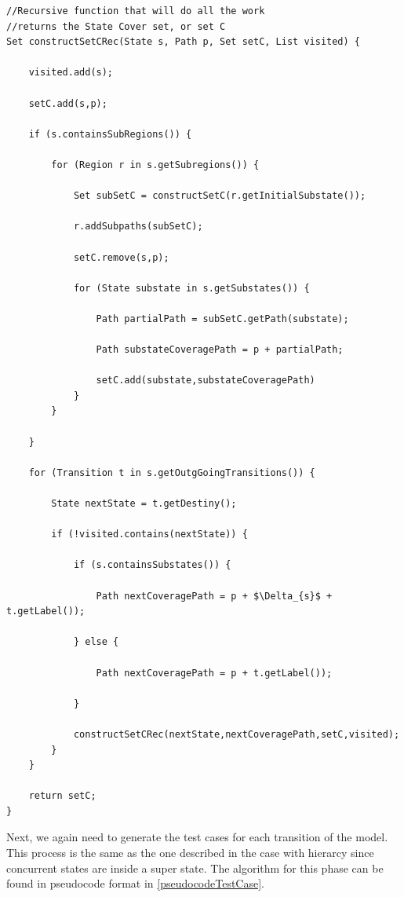 \begin{lstlisting}[mathescape,label={testOrthogonalityPseudo}]
//Recursive function that will do all the work
//returns the State Cover set, or set C
Set constructSetCRec(State s, Path p, Set setC, List visited) {

	visited.add(s);

	setC.add(s,p);

	if (s.containsSubRegions()) {

		for (Region r in s.getSubregions()) {
			
			Set subSetC = constructSetC(r.getInitialSubstate());	

			r.addSubpaths(subSetC);

			setC.remove(s,p);

			for (State substate in s.getSubstates()) {
	
				Path partialPath = subSetC.getPath(substate);
	
				Path substateCoveragePath = p + partialPath;
	
				setC.add(substate,substateCoveragePath)	
			}
		}	
		
	}
	
	for (Transition t in s.getOutgGoingTransitions()) {
		
		State nextState = t.getDestiny();

		if (!visited.contains(nextState)) {

			if (s.containsSubstates()) {
			
				Path nextCoveragePath = p + $\Delta_{s}$ + t.getLabel());

			} else {

				Path nextCoveragePath = p + t.getLabel());

			}	

			constructSetCRec(nextState,nextCoveragePath,setC,visited);	
		}
	}
	
	return setC;
}
\end{lstlisting}

Next, we again need to generate the test cases for each transition of the model. This process is the same as the one described in the case with hierarcy since concurrent states are inside a super state. The algorithm for this phase can be found in pseudocode format in \ref{pseudocodeTestCase}.

